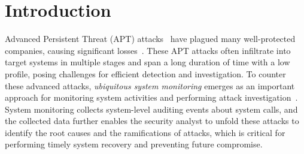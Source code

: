 \section{Introduction}

Advanced Persistent Threat (APT) attacks~\cite{fireeye:anatomy,aptsymantec} have plagued many well-protected companies, causing significant 
losses~\cite{ebay,opm,target,homedepot,ya:yahooleak,equifax,marriott}.
These APT attacks often infiltrate into target systems in multiple stages 
and span a long duration of time with a low profile, posing challenges for efficient detection and investigation.
To counter these advanced attacks, \emph{ubiquitous system monitoring} emerges as an important approach for monitoring system activities and performing attack investigation~\cite{backtracking,backtracking2,wormlog,logtracking,mcitracking,liu2018priotracker,hassan2019nodoze,gao2018aiql,gao2018saql}.
System monitoring collects system-level auditing events about system calls,
and the collected data further enables the security analyst to unfold these attacks to identify the root causes and the ramifications of attacks,
which is critical for performing timely system recovery and preventing future compromise.

